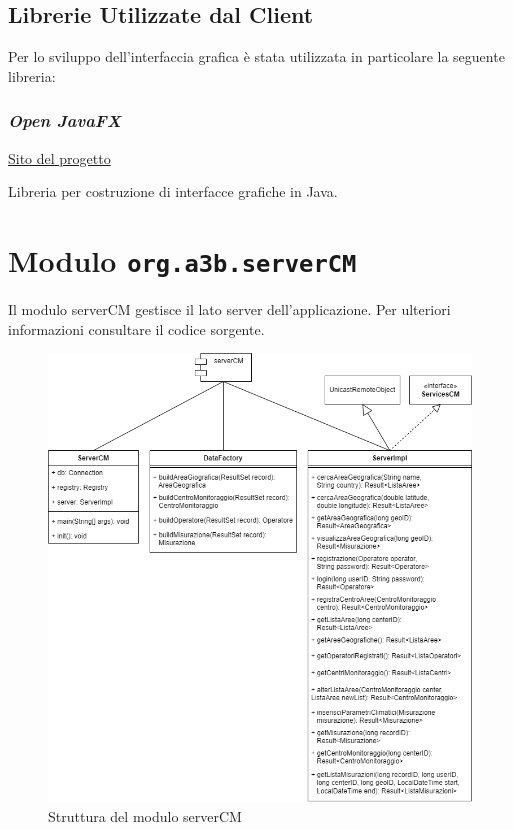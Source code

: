 \section{Librerie Utilizzate dal Client}
Per lo sviluppo dell'interfaccia grafica è stata utilizzata in particolare la seguente libreria:

\subsection{\textsl{Open JavaFX}}

\href{https://openjfx.io/}{Sito del progetto}

Libreria per costruzione di interfacce grafiche in Java.

\chapter{Modulo \texttt{org.a3b.serverCM}}
Il modulo serverCM gestisce il lato server dell'applicazione. Per ulteriori informazioni consultare il codice sorgente.
\label{ch:server}

\begin{figure}[h]
	\centering
	\caption{Struttura del modulo serverCM}
	\label{fig:severcm}
	\includegraphics[width=0.9\linewidth]{../../fig/img/tecnico/serverCM.drawio}
\end{figure}
\pagebreak

